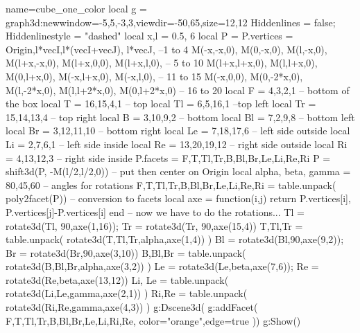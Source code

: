 \documentclass[12pt]{standalone}
\begin{document}
\begin{luadraw}{name=cube_one_color}
local g = graph3d:new{window={-5,5,-3,3},viewdir={-50,65},size={12,12}}
Hiddenlines = false; Hiddenlinestyle = "dashed"
local x,l = 0.5, 6
local P = {}
P.vertices = {
    Origin,l*vecI,l*(vecI+vecJ), l*vecJ, --1 to 4
    M(-x,-x,0), M(0,-x,0), M(l,-x,0), M(l+x,-x,0), M(l+x,0,0), M(l+x,l,0), -- 5 to 10
    M(l+x,l+x,0), M(l,l+x,0), M(0,l+x,0), M(-x,l+x,0), M(-x,l,0), -- 11 to 15
    M(-x,0,0), M(0,-2*x,0), M(l,-2*x,0), M(l,l+2*x,0), M(0,l+2*x,0)} -- 16 to 20
local F = {4,3,2,1} -- bottom of the box
local T = {16,15,4,1} -- top
local Tl = {6,5,16,1}  --top left
local Tr = {15,14,13,4} -- top right
local B = {3,10,9,2}  -- bottom
local Bl = {7,2,9,8}  -- bottom left
local Br = {3,12,11,10}  -- bottom right
local Le = {7,18,17,6}   -- left side outside
local Li = {2,7,6,1}  -- left side inside
local Re = {13,20,19,12} -- right side outside
local Ri = {4,13,12,3} -- right side inside
P.facets = {F,T,Tl,Tr,B,Bl,Br,Le,Li,Re,Ri}
P = shift3d(P, -M(l/2,l/2,0)) -- put then center on Origin
local alpha, beta, gamma = 80,45,60 -- angles for rotations
F,T,Tl,Tr,B,Bl,Br,Le,Li,Re,Ri = table.unpack( poly2facet(P)) -- conversion to facets
local axe = function(i,j)
    return {P.vertices[i], P.vertices[j]-P.vertices[i]}
end
-- now we have to do the rotations...
Tl = rotate3d(Tl, 90,axe(1,16)); Tr = rotate3d(Tr, 90,axe(15,4))
T,Tl,Tr = table.unpack( rotate3d({T,Tl,Tr},alpha,axe(1,4)) )
Bl = rotate3d(Bl,90,axe(9,2)); Br = rotate3d(Br,90,axe(3,10))
B,Bl,Br = table.unpack( rotate3d({B,Bl,Br},alpha,axe(3,2)) )
Le = rotate3d(Le,beta,axe(7,6)); Re = rotate3d(Re,beta,axe(13,12))
Li, Le = table.unpack( rotate3d({Li,Le},gamma,axe(2,1)) )
Ri,Re = table.unpack( rotate3d({Ri,Re},gamma,axe(4,3)) )
g:Dscene3d( g:addFacet( {F,T,Tl,Tr,B,Bl,Br,Le,Li,Ri,Re}, {color="orange",edge=true} ))
g:Show()
\end{luadraw}
\end{document}
